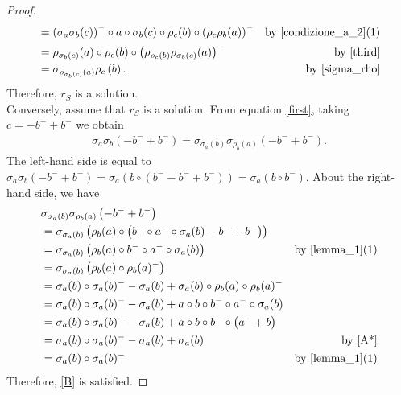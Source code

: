 \documentclass[10pt,a4paper]{amsart}
\begin{document}
\begin{proof}
\begin{align*}
    &=\left(\sigma_{a}\sigma_b(c)\right)^- \circ a \circ \sigma_b(c) \circ \rho_c(b) \circ \left(\rho_c \rho_b(a)   \right)^-&\mbox{by \cref{condizione_a_2}(1)}\\
    &=\rho_{\sigma_b(c)}(a) \circ \rho_c(b) \circ \left(\rho_{\rho_c(b)}\rho_{\sigma_b(c)}(a)\right)^-&\mbox{by \eqref{third}}\\
&=\sigma_{\rho_{\sigma_b\left(c\right)}\left(a\right)}\rho_c\left(b\right). &\mbox{by \cref{sigma_rho}}
\end{align*}
Therefore, $r_S$ is a solution.\\
Conversely, assume that $r_S$ is a solution. From equation \eqref{first}, taking $c=-b^-+b^-$ we obtain
   \begin{align*}
\sigma_a\sigma_b\left(-b^-+b^-\right)=\sigma_{\sigma_a\left(b\right)}\sigma_{\rho_b\left(a\right)}\left(-b^-+b^-\right).  
   \end{align*}
   The left-hand side is equal to $
  \sigma_a\sigma_b\left(-b^-+b^-\right)=\sigma_a\left(b \circ \left( b^--b^-+b^-\right)\right)=\sigma_a\left(b \circ b^- \right)$. About the right-hand side, we have
  \begin{align*}
&\sigma_{\sigma_a\left(b\right)}\sigma_{\rho_b\left(a\right)}\left(-b^-+b^-\right)\\
   &=\sigma_{\sigma_a\left(b\right)}\left(\rho_b(a) \circ \left(b^- \circ a^- \circ \sigma_a(b)-b^-+b^-\right)\right)\\
   &=\sigma_{\sigma_a\left(b\right)}\left(\rho_b(a) \circ b^- \circ a^- \circ \sigma_a(b)\right) &\mbox{by \cref{lemma_1}(1)}\\
&=\sigma_{\sigma_a\left(b\right)}\left(\rho_b(a) \circ \rho_b(a)^-\right)\\
  &=\sigma_a(b) \circ \sigma_a(b)^--\sigma_a(b)+ \sigma_a(b) \circ \rho_b(a) \circ \rho_b(a)^-\\
    &=\sigma_a(b) \circ \sigma_a(b)^--\sigma_a(b)+ a \circ b \circ b^- \circ a^- \circ \sigma_a(b)\\
   &=\sigma_a(b) \circ \sigma_a(b)^--\sigma_a(b)+a \circ b \circ b^- \circ \left(a^-+b\right)\\
   &= \sigma_a(b) \circ \sigma_a(b)^--\sigma_a(b)+\sigma_a(b) &\mbox{by \cref{A*}}\\
   &=\sigma_a(b) \circ \sigma_a(b)^- &\mbox{by \cref{lemma_1}(1)}
  \end{align*}
Therefore, \eqref{B} is satisfied.
\end{proof}
\end{document}
